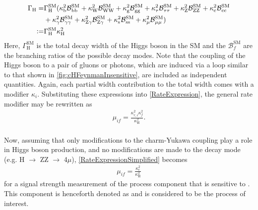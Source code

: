 \begin{align}
    \Gamma_{\mathrm{H}} =& \Gamma_{\mathrm{H}}^{\mathrm{SM}}(\kappa_\mathrm{b}^2\mathcal{B}\mathrm{_{bb}^{SM}} + \kappa_\mathrm{W}^2\mathcal{B}\mathrm{_{WW}^{SM}} + \kappa_\mathrm{g}^2\mathcal{B}\mathrm{_{gg}^{SM}} + \kappa_\mathrm{\tau}^2\mathcal{B}\mathrm{_{\tau\tau}^{SM}} + \kappa_\mathrm{Z}^2\mathcal{B}\mathrm{_{ZZ}^{SM}} + \kappa_\mathrm{c}^2\mathcal{B}\mathrm{_{cc}^{SM}} \nonumber \\
    \quad& + \kappa_\mathrm{\gamma}^2\mathcal{B}\mathrm{_{\gamma\gamma}^{SM}}+ \kappa_\mathrm{Z\gamma}^2\mathcal{B}\mathrm{_{Z\gamma}^{SM}} + \kappa_\mathrm{s}^2\mathcal{B}\mathrm{_{ss}^{SM}} + \kappa_\mathrm{\mu}^2\mathcal{B}\mathrm{_{\mu\mu}^{SM}}) \label{TotalModifiedWidthSum} \\
    \vcentcolon=& \Gamma_{\mathrm{H}}^{\mathrm{SM}} \kappa_\mathrm{H}^2 \label{TotalModifiedWidth}
\end{align}
Here, $\Gamma_{\mathrm{H}}^{\mathrm{SM}}$ is the total decay width of the Higgs boson in the SM and the $\mathcal{B}_f^{\mathrm{SM}}$ are the branching ratios of the possible decay modes. Note that the coupling of the Higgs boson to a pair of gluons or photons, which are induced via a loop similar to that shown in \autoref{fig:cHFeynmanInsensitive}, are included as independent quantities. Again, each partial width contribution to the total width comes with a modifier $\kappa_i$. Substituting these expressions into \autoref{RateExpression}, the general rate modifier may be rewritten as
\begin{align}
    \mu_{if} = \frac{\kappa_{r,i}^2 \kappa_f^2}{\kappa_{\mathrm{H}}^2}. \label{RateExpressionSimplified}
\end{align}
\\
Now, assuming that only modifications to the charm-Yukawa coupling play a role in Higgs boson production, and no modifications are made to the decay mode (e.g. H $\rightarrow$ ZZ $\rightarrow$ 4$\mu$), \autoref{RateExpressionSimplified} becomes
\begin{align}
    \mu_{if} = \frac{\kappa_{\mathrm{c}}^2}{\kappa_{\mathrm{H}}^2} \label{RateExpressionForC}
\end{align}
for a signal strength measurement of the \cHZZ process component that is sensitive to \kappac. This component is henceforth denoted as \cHZZsen and is considered to be the process of interest. \\
\\
